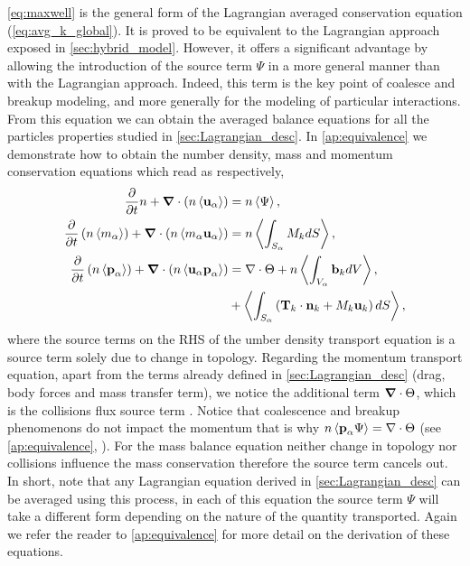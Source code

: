 \ref{eq:maxwell} is the general form of the Lagrangian averaged conservation equation (\ref{eq:avg_k_global}). 
It is proved to be equivalent to the Lagrangian approach exposed in \ref{sec:hybrid_model}. 
However, it offers a significant advantage by allowing the introduction of the source term $\Psi$ in a more general manner than with the Lagrangian approach.
Indeed, this term is the key point of coalesce and breakup modeling, and more generally for the modeling of particular interactions. 
From this equation we can obtain the averaged balance equations for all the particles properties studied in \ref{sec:Lagrangian_desc}.
In \ref{ap:equivalence} we demonstrate how to obtain the number density, mass and momentum conservation equations which read as respectively,
\begin{align*}
    \frac{\partial}{\partial t} n
    + \bm{\nabla} \cdot \left(n \left<\textbf{u}_\alpha\right>\right)
    &= n\left<\Psi\right>,\\
    \frac{\partial}{\partial t} \left(n\left<m_\alpha\right>\right)
    + \bm{\nabla} \cdot \left(n \left<m_\alpha \textbf{u}_\alpha\right>\right)
    &= n\left<\int_{S_\alpha} M_k dS\right>,\\
    \frac{\partial}{\partial t} \left( n \left<\textbf{p}_\alpha\right>\right)
    + \bm{\nabla} \cdot \left(n \left<\textbf{u}_\alpha \textbf{p}_\alpha\right>\right)
    &=  \nabla \cdot \Theta
    + n\left<\int_{V_\alpha} \textbf{b}_k dV\right>,\\
    &+ \left<\int_{S_\alpha} \left(
    \textbf{T}_k\cdot\textbf{n}_k
    + M_k \textbf{u}_k
    \right)dS\right>,
\end{align*}
where the source terms on the RHS of the umber density transport equation is a source term solely due to change in topology.
Regarding the momentum transport equation, apart from the terms already defined in \ref{sec:Lagrangian_desc} (drag, body forces and mass transfer term), we notice the additional term $\bm{\nabla}\cdot\Theta$, which is the collisions flux source term \citep{curtiss1956kinetic}. 
Notice that coalescence and breakup phenomenons do not impact the momentum that is why $n \left<\textbf{p}_\alpha \Psi\right> = \nabla\cdot\Theta$ (see \ref{ap:equivalence}, \citep{KAMP20011363}). 
For the mass balance equation neither change in topology nor collisions influence the mass conservation therefore the source term cancels out. 
In short, note that any Lagrangian equation derived in \ref{sec:Lagrangian_desc} can be averaged using this process, in each of this equation the source term $\Psi$ will take a different form depending on the nature of the quantity transported. 
Again we refer the reader to \ref{ap:equivalence} for more detail on the derivation of these equations. 



